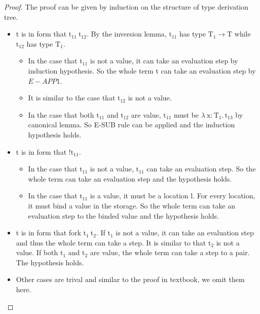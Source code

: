 \documentclass[10pt]{article}
\theoremstyle{definition}\newtheorem*{theorem}{Theorem}
\theoremstyle{definition}\newtheorem*{definition}{Definition}
\theoremstyle{definition}\newtheorem*{lemma}{Lemma}
\begin{document}
    \begin{proof}
        The proof can be given by induction on the structure of type derivation tree.
        \begin{itemize}
            \item t is in form that $\mathrm{t_{11}}\ \mathrm{t_{12}}$. By the inversion lemma, $\mathrm{t_{11}}$ has type $\mathrm{T_1}\to\mathrm{T}$ while $\mathrm{t_{12}}$ has type $\mathrm{T_1}$.
                \begin{itemize}
                    \item In the case that $\mathrm{t_{11}}$ is not a value, it can take an evaluation step by induction hypothesis. So the whole term t can take an evaluation step by $E-APP1$.
                    \item It is similar to the case that $\mathrm{t_{12}}$ is not a value. 
                    \item In the case that both $\mathrm{t_{11}}$ and $\mathrm{t_{12}}$ are value, $\mathrm{t_{11}}$ must be $\lambda\ \mathrm{x}\colon\mathrm{T_1}.\,\mathrm{t_{13}}$ by canonical lemma.
                            So E-SUB rule can be applied and the induction hypothesis holds.
                \end{itemize}
            \item t is in form that $!\mathrm{t_{11}}$. 
                \begin{itemize}
                    \item In the case that $\mathrm{t_{11}}$ is not a value, $\mathrm{t_{11}}$ can take an evaluation step. So the whole term can take an evaluation step and the hypothesis holds.
                    \item In the case that $\mathrm{t_{11}}$ is a value, it must be a location $\mathrm{l}$. For every location, it must bind a value in the storage. So the whole term can take an evaluation step to the binded value and the hypothesis holds.
                \end{itemize}
            \item t is in form that fork $\mathrm{t_1}\ \mathrm{t_2}$. If $\mathrm{t_1}$ is not a value, it can take an evaluation step and thus the whole term can take a step.
                It is similar to that $\mathrm{t_2}$ is not a value. If both $\mathrm{t_1}$ and $\mathrm{t_2}$ are value, the whole term can take a step to a pair. The hypothesis holds.
            \item Other cases are trival and similar to the proof in textbook, we omit them here.
        \end{itemize}
    \end{proof}
\end{document}
